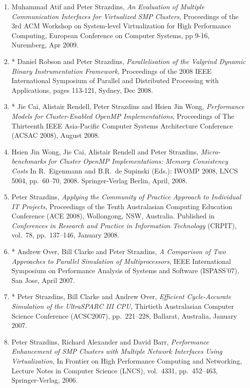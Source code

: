 \documentclass[a4paper,oneside,12pt]{article}
\begin{document}
\begin{enumerate}
\item Muhammad Atif and Peter Strazdins, {\em An Evaluation of Multiple
Communication Interfaces for Virtualized SMP Clusters}, Proceedings of
the 3rd ACM Workshop on System-level Virtualization for High Performance
Computing, European Conference on Computer Systems, pp 9-16, Nuremberg,
Apr 2009.

\item * Daniel Robson and Peter Strazdins, {\em Parallelisation of the
Valgrind Dynamic Binary Instrumentation Framework}, Proceedings of   
the 2008 IEEE International Symposium of Parallel and Distributed
Processing with Applications, pages 113-121, Sydney, Dec 2008.

\item  
* Jie Cai, Alistair Rendell, {Peter Strazdins} and Hsien Jin Wong, {\em
  Performance Models for Cluster-Enabled OpenMP Implementations},
Proceedings of The Thirteenth IEEE Asia-Pacific Computer Systems
Architecture Conference (ACSAC 2008), August 2008.

\item Hsien Jin Wong, Jie Cai, Alistair Rendell and {Peter Strazdins}, 
 {\em Micro-benchmarks for Cluster OpenMP Implementations:
      Memory Consistency Costs} 
      In R.\ Eigenmann and B.R.\ de Supinski (Eds.): IWOMP 2008, LNCS
      5004, pp.\ 60--70, 2008. Springer-Verlag Berlin, April, 2008.

\item {Peter Strazdins}, {\em Applying the Community of Practice Approach to Individual
      IT Projects},
      Proceedings of the Tenth Australasian Computing Education
      Conference (ACE 2008), Wollongong, NSW, Australia. Published in
      \emph{Conferences in Research and Practice in Information
      Technology} (CRPIT), vol.\ 78, pp.\ 137--146, January 2008.

\item  * Andrew Over, Bill Clarke and Peter Strazdins,
{\em A Comparison of Two Approaches to Parallel Simulation of
      Multiprocessors},
      IEEE International Symposium on Performance Analysis of
      Systems and Software (ISPASS'07), San Jose, April 2007.

\item * {Peter Strazdins}, Bill Clarke and Andrew Over,
	{\em Efficient Cycle-Accurate Simulation of the UltraSPARC III
      CPU}, 
      Thirtieth Australasian Computer Science Conference (ACSC2007),
      pp.\ 221--228, Ballarat, Australia, January 2007.

\item {Peter Strazdins}, Richard Alexander and David Barr, 
{\em Performance Enhancement of SMP Clusters with Multiple
      Network Interfaces Using Virtualization},
            In Frontier on High Performance Computing and Networking,
      Lecture Notes in Computer Science (LNCS), vol.\ 4331, pp.\
      452--463, Springer-Verlag, 2006.


\end{enumerate}
\end{document}
